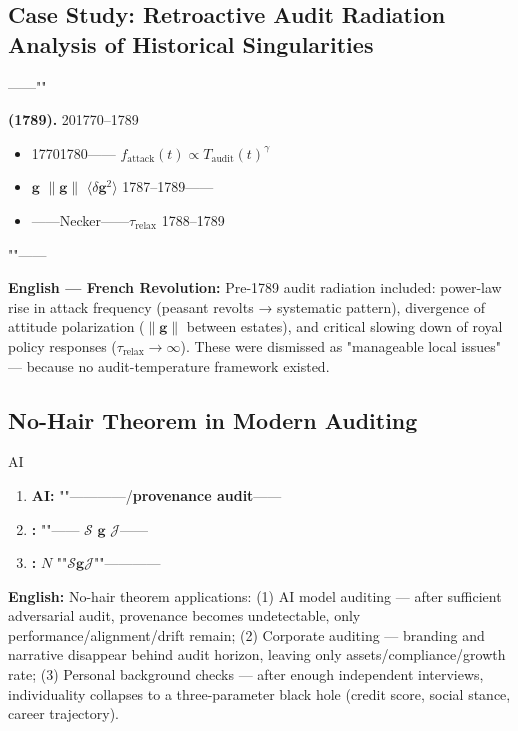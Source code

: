 \documentclass[12pt,a4paper]{article}
\theoremstyle{remark}
\newcommand{\g}{\mathbf{g}}
\begin{document}
\subsection{Case Study: Retroactive Audit Radiation Analysis of Historical Singularities}

\noindent
\textbf{} ——""

\vspace{4pt}
\noindent
\textbf{ (1789).} 201770--1789
\begin{itemize}
    \item 17701780—— $f_{\mathrm{attack}}(t) \propto T_{\mathrm{audit}}(t)^\gamma$ 
    \item  $\g$  $\|\g\|$  $\langle\delta\g^2\rangle$ 1787--1789——
    \item ——Necker——$\tau_{\mathrm{relax}}$ 1788--1789
\end{itemize}

""——

\vspace{4pt}
\noindent
\textbf{English — French Revolution:} Pre-1789 audit radiation included: power-law rise in attack frequency (peasant revolts → systematic pattern), divergence of attitude polarization ($\|\g\|$ between estates), and critical slowing down of royal policy responses ($\tau_{\mathrm{relax}} \to \infty$). These were dismissed as "manageable local issues" — because no audit-temperature framework existed.

\subsection{}
\subsection{No-Hair Theorem in Modern Auditing}

\noindent
\textbf{} AI

\begin{enumerate}[label=(\arabic*)]
    \item \textbf{AI:} ""————/\textbf{provenance audit}——
    
    \item \textbf{:} ""—— $\mathcal{S}$ $\g$ $\mathcal{J}$——\textbf{}
    
    \item \textbf{:} $N$ ""$\mathcal{S}$$\g$$\mathcal{J}$""————
\end{enumerate}

\vspace{4pt}
\noindent
\textbf{English:} No-hair theorem applications: (1) AI model auditing — after sufficient adversarial audit, provenance becomes undetectable, only performance/alignment/drift remain; (2) Corporate auditing — branding and narrative disappear behind audit horizon, leaving only assets/compliance/growth rate; (3) Personal background checks — after enough independent interviews, individuality collapses to a three-parameter black hole (credit score, social stance, career trajectory).
\end{document}
